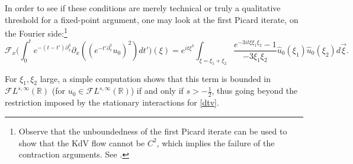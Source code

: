 \documentclass[a4paper,
11pt,  reqno]{amsart}
\newcommand{\5}{\textup{V}}
\newcommand{\dx}{\partial_x}
\theoremstyle{remark}
\newcommand{\R}{\mathbb{R}}
\newcommand{\Ft}{{\mathcal{F}}}
\numberwithin{equation}{section}
\numberwithin{theorem}{section}
\begin{document}
	
	\medskip
	In order to see if these conditions are merely technical or truly a qualitative threshold for a fixed-point argument, one may look at the {first Picard iterate}, on the Fourier side:\footnote{Observe that the unboundedness of the first Picard iterate can be used to show that the KdV flow cannot be $C^2$, which implies the failure of the contraction arguments. See  \cite{bou_ill_kdv, MolTzeSaut_ill, Tzvetkov_ill}.}
	\begin{equation}\label{picard1}
\Ft_x\bigg(
	\int_0^t e^{-(t-t')\dx^3}\partial_x((e^{-t'\dx^3}u_0)^2)dt'
\bigg) (\xi)
=
e^{it \xi^3}
\int_{\xi=\xi_1+\xi_2}\frac{e^{-3it\xi\xi_1\xi_2}-1}{-3\xi_1\xi_2} \widehat{u}_0( \xi_1) \widehat{u}_0(\xi_2) d\vec{\xi}.
\end{equation}

	For $\xi_1, \xi_2$ large, 
	a simple computation shows that this term is bounded in $\mathcal{F}L^{s,\infty}(\R)$ (for $u_0\in \mathcal{F}L^{s,\infty}(\R)$) if and only if $s>-\frac12$, thus going beyond the restriction imposed by the stationary interactions for \eqref{dtv}. 
	
\end{document}
